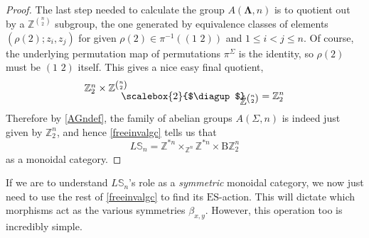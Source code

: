 \documentclass{amsbook} %
\newcommand{\ML}{\mathbf{\Lambda}}
\newcommand{\bigquotient}[2]{ \raisebox{0.75\height}{$#1$} \mkern-12mu\scalebox{2}{$\diagup$}\mkern-10mu \raisebox{-0.5\height}{$#2$} }
\newcommand{\trans}[2]{( #1 \, \, #2 )}
\numberwithin{section}{chapter}
\begin{document}
\begin{proof}
The last step needed to calculate the group $A(\ML,n)$ is to quotient out by a $\mathbb{Z}^{\binom{n}{2}}$ subgroup, the one generated by equivalence classes of elements $(\rho(2) ; z_i, z_j )$ for given $\rho(2) \in \pi^{-1}(\trans{1}{2})$ and $1 \le i < j \le n$. Of course, the underlying permutation map of permutations $\pi^{\Sigma}$ is the identity, so $\rho(2)$ must be $\trans{1}{2}$ itself. This gives a nice easy final quotient,
  \[
    \bigquotient{\mathbb{Z}_2^{n} \times \mathbb{Z}^{\binom{n}{2}}}{\mathbb{Z}^{\binom{n}{2}}} = \mathbb{Z}_2^{n}
  \]
Therefore by \cref{AGndef}, the family of abelian groups $A(\Sigma,n)$ is indeed just given by $\mathbb{Z}_2^{n}$, and hence \cref{freeinvalgc} tells us that
  \[
    L\mathbb{S}_n = \mathbb{Z}^{\ast n} \times_{\mathbb{Z}^n} \mathbb{Z}^{\ast n}  \times \mathrm{B}\mathbb{Z}_2^{n}
  \]
as a monoidal category.
\end{proof} 

If we are to understand $L\mathbb{S}_n$'s role as a \emph{symmetric} monoidal category, we now just need to use the rest of \cref{freeinvalgc} to find its $\mathrm{ES}$-action. This will dictate which morphisms act as the various symmetries $\beta_{x, y}$. However, this operation too is incredibly simple.
\end{document}
